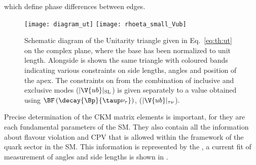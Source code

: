 which define phase differences between edges.

\begin{figure}
  \begin{center}
      \texttt{[image: diagram\_ut]}
      \texttt{[image: rhoeta\_small\_Vub]}
  \end{center}
  \caption[Unitarity triangle]{\small
    Schematic diagram of the Unitarity triangle given in Eq.~\ref{eq:th:ut} on the complex plane,
    where the base has been normalized to unit length.
    Alongside is shown the same triangle with coloured bands indicating various constraints on
    side lengths, angles and position of the apex.
    The constraints on  from the combination of inclusive and exclusive modes
    ($|\V{ub}|_\mathrm{SL}$) is given separately to a value obtained using
    $\BF\left(\decay{\Bp}{\taup\nu_\tau}\right)$, ($|\V{ub}|_{\tau\nu}$).
  }
  \label{fig:th:ut}
\end{figure}

Precise determination of the CKM matrix elements is important, for  they are each fundamental
parameters of the SM.
They also contain all the information about flavour violation and CPV that is allowed within the
framework of the quark sector in the SM.
This information is represented by the \ut, a current fit of measurement of angles and side lengths
is shown in .

%



